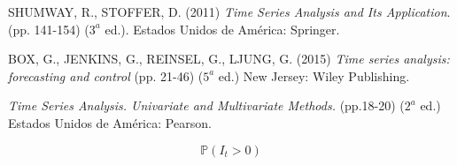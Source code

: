\documentclass{article}
\theoremstyle{remark}
\begin{document}
\begin{thebibliography}{X}
 \textsc{SHUMWAY, R., STOFFER, D. (2011)} \textit{Time Series Analysis and Its Application}.(pp. 141-154) (\(3^{a}\) ed.).  Estados Unidos de América: Springer.

 \textsc{BOX, G., JENKINS, G., REINSEL, G., LJUNG, G. (2015)} \textit{Time series analysis: forecasting and control} (pp. 21-46) (\(5^{a}\) ed.) New Jersey: Wiley Publishing.

  \textit{Time Series Analysis. Univariate and Multivariate Methods.} (pp.18-20) (\(2^{a}\) ed.) Estados Unidos de América: Pearson. 



\end{thebibliography} 

\[\mathbb{P}(I_t > 0)\]
\end{document}
